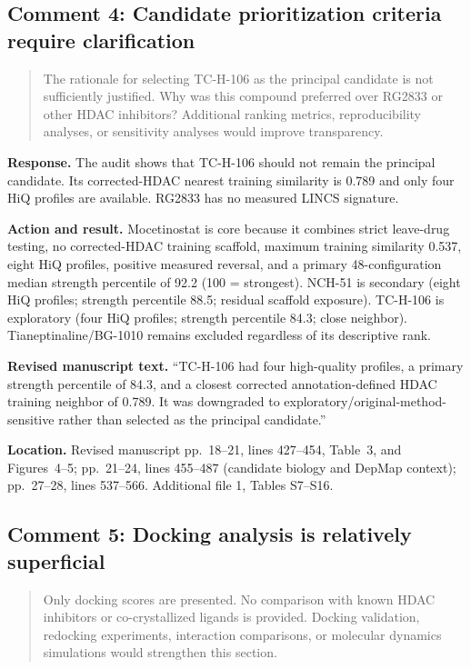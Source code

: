 \documentclass[10pt]{article}
\newenvironment{reviewcomment}{%
  \begin{quote}\small\itshape\color{black}
}{\end{quote}}
\newcommand{\Response}{\textbf{Response.} }
\newcommand{\Action}{\textbf{Action and result.} }
\newcommand{\RevisedText}{\textbf{Revised manuscript text.} }
\newcommand{\Location}{\textbf{Location.} }
\newcommand{\qtext}[1]{``#1''}
\begin{document}
\subsection*{Comment 4: Candidate prioritization criteria require clarification}
\begin{reviewcomment}
The rationale for selecting TC-H-106 as the principal candidate is not sufficiently justified. Why was this compound preferred over RG2833 or other HDAC inhibitors? Additional ranking metrics, reproducibility analyses, or sensitivity analyses would improve transparency.
\end{reviewcomment}

\Response The audit shows that TC-H-106 should not remain the principal candidate. Its corrected-HDAC nearest training similarity is 0.789 and only four HiQ profiles are available. RG2833 has no measured LINCS signature.

\Action Mocetinostat is core because it combines strict leave-drug testing, no corrected-HDAC training scaffold, maximum training similarity 0.537, eight HiQ profiles, positive measured reversal, and a primary 48-configuration median strength percentile of 92.2 (100 = strongest). NCH-51 is secondary (eight HiQ profiles; strength percentile 88.5; residual scaffold exposure). TC-H-106 is exploratory (four HiQ profiles; strength percentile 84.3; close neighbor). Tianeptinaline/BG-1010 remains excluded regardless of its descriptive rank.

\RevisedText \qtext{TC-H-106 had four high-quality profiles, a primary strength percentile of 84.3, and a closest corrected annotation-defined HDAC training neighbor of 0.789. It was downgraded to exploratory/original-method-sensitive rather than selected as the principal candidate.}

\Location Revised manuscript pp.~18--21, lines 427--454, Table~3, and Figures~4--5; pp.~21--24, lines 455--487 (candidate biology and DepMap context); pp.~27--28, lines 537--566. Additional file 1, Tables S7--S16.

\subsection*{Comment 5: Docking analysis is relatively superficial}
\begin{reviewcomment}
Only docking scores are presented. No comparison with known HDAC inhibitors or co-crystallized ligands is provided. Docking validation, redocking experiments, interaction comparisons, or molecular dynamics simulations would strengthen this section.
\end{reviewcomment}
\end{document}
